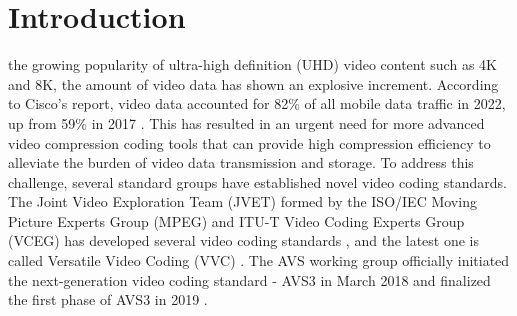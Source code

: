 \documentclass[lettersize,journal]{IEEEtran}
\begin{document}
\section{Introduction}
\label{sec:1}
 the growing popularity of ultra-high definition (UHD) video content such as 4K and 8K, the amount of video data has shown an explosive increment. According to Cisco's report, video data accounted for 82\% of all mobile data traffic in 2022, up from 59\% in 2017 \cite{barnett2018cisco}. This has resulted in an urgent need for more advanced video compression coding tools that can provide high compression efficiency to alleviate the burden of video data transmission and storage. To address this challenge, several standard groups have established novel video coding standards. The Joint Video Exploration Team (JVET) formed by the ISO/IEC Moving Picture Experts Group (MPEG) and ITU-T Video Coding Experts Group (VCEG) has developed several video coding standards \cite{1994H.262/MPEG-2, avcoverview, sullivan2012hevcoverview}, and the latest one is called Versatile Video Coding (VVC) \cite{bross2021vvcoverview}. The AVS working group officially initiated the next-generation video coding standard - AVS3 in March 2018 and finalized the first phase of AVS3 in 2019 \cite{zhang2019avs3overview}. 
\end{document}
